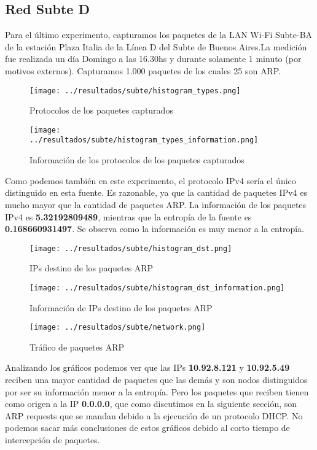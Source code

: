 \subsection{Red Subte D}

Para el último experimento, capturamos los paquetes de la LAN Wi-Fi Subte-BA de la estación Plaza Italia de la Línea D del Subte de Buenos Aires.La medición fue realizada un día Domingo a las 16.30hs y durante solamente 1 minuto (por motivos externos). Capturamos 1.000 paquetes de los cuales 25 son ARP.

\begin{figure}[H]
       \centering
       \texttt{[image: ../resultados/subte/histogram\_types.png]}
       \caption{Protocolos de los paquetes capturados}
       \label{red-Starbucks-types}
\end{figure}

\begin{figure}[H]
       \centering
       \texttt{[image: ../resultados/subte/histogram\_types\_information.png]}
       \caption{Información de los protocolos de los paquetes capturados}
       \label{red-Starbucks-types-information}
\end{figure}

Como podemos también en este experimento, el protocolo IPv4 sería el único distinguido en esta fuente. Es razonable, ya que la cantidad de paquetes IPv4 es mucho mayor que la cantidad de paquetes ARP. La información de los paquetes IPv4 es \textbf{5.32192809489}, mientras que la entropía de la fuente es \textbf{0.168660931497}. Se observa como la información es muy menor a la entropía.

\begin{figure}[H]
       \centering
       \texttt{[image: ../resultados/subte/histogram\_dst.png]}
       \caption{IPs destino de los paquetes ARP}
       \label{red-Starbucks-dst}
\end{figure}

\begin{figure}[H]
       \centering
       \texttt{[image: ../resultados/subte/histogram\_dst\_information.png]}
       \caption{Información de IPs destino de los paquetes ARP}
       \label{red-Starbucks-dst-information}
\end{figure}

\begin{figure}[H]
       \centering
       \texttt{[image: ../resultados/subte/network.png]}
       \caption{Tráfico de paquetes ARP}
       \label{red-Starbucks-dst-information}
\end{figure}

Analizando los gráficos podemos ver que las IPs \textbf{10.92.8.121} y \textbf{10.92.5.49} reciben una mayor cantidad de paquetes que las demás y son nodos distinguidos por ser su información menor a la entropía. Pero los paquetes que reciben tienen como origen a la IP \textbf{0.0.0.0}, que como discutimos en la siguiente sección, son ARP requests que se mandan debido a la ejecución de un protocolo DHCP. No podemos sacar más conclusiones de estos gráficos debido al corto tiempo de intercepción de paquetes.\\